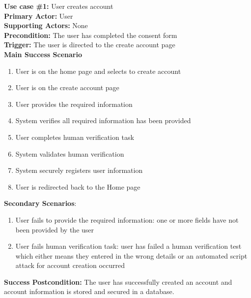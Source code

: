 \documentclass{article}
\begin{document}
\textbf{Use case \#1:} User creates account\\
\textbf{Primary Actor:} User\\
\textbf{Supporting Actors:} None\\
\textbf{Precondition:} The user has completed the consent form\\
\textbf{Trigger:} The user is directed to the create account page\\
\textbf{Main Success Scenario}
\begin{enumerate}
    \item User is on the home page and selects to create account
    \item User is on the create account page
    \item User provides the required information
    \item System verifies all required information has been provided
    \item User completes human verification task
    \item System validates human verification
    \item System securely registers user information
    \item User is redirected back to the Home page
\end{enumerate}
\textbf{Secondary Scenarios}:
\begin{enumerate}
    \item User fails to provide the required information: one or more fields have not been provided by the user
    \item User fails human verification task: user has failed a human verification test which either means they entered in the wrong details or an automated script attack for account creation occurred

\end{enumerate}
\textbf{Success Postcondition:} The user has successfully created an account and account information is stored and secured in a database.
\end{document}
